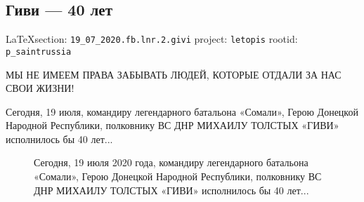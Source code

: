  
 
\subsection{Гиви --- 40 лет}
\label{sec:19_07_2020.fb.lnr.2.givi}
  
\vspace{0.5cm}
{\small\LaTeX section: \verb|19_07_2020.fb.lnr.2.givi| project: \verb|letopis| rootid: \verb|p_saintrussia|}
\vspace{0.5cm}

МЫ НЕ ИМЕЕМ ПРАВА ЗАБЫВАТЬ ЛЮДЕЙ, КОТОРЫЕ ОТДАЛИ ЗА НАС СВОИ ЖИЗНИ!

Сегодня, 19 июля, командиру легендарного батальона «Сомали», Герою Донецкой
Народной Республики, полковнику ВС ДНР МИХАИЛУ ТОЛСТЫХ «ГИВИ» исполнилось бы 40
лет...
  
\begin{figure}[ht]
 \centering
 \caption{Сегодня, 19 июля 2020 года, командиру легендарного батальона «Сомали», Герою
				Донецкой Народной Республики, полковнику ВС ДНР МИХАИЛУ ТОЛСТЫХ «ГИВИ»
				исполнилось бы 40 лет...}
 \label{fig:}
\end{figure}
